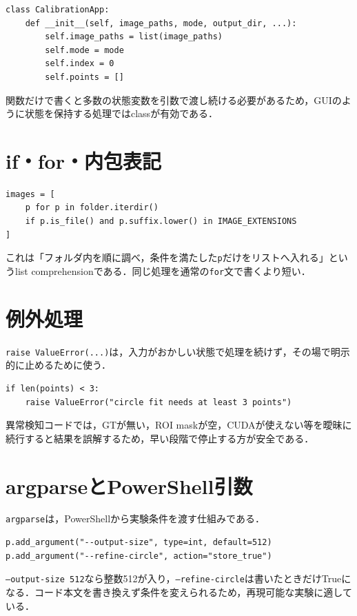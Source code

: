 \documentclass[a4paper,11pt]{ltjsreport}
\begin{document}
\begin{lstlisting}
class CalibrationApp:
    def __init__(self, image_paths, mode, output_dir, ...):
        self.image_paths = list(image_paths)
        self.mode = mode
        self.index = 0
        self.points = []
\end{lstlisting}

関数だけで書くと多数の状態変数を引数で渡し続ける必要があるため，GUIのように状態を保持する処理ではclassが有効である．

\section{if・for・内包表記}
\begin{lstlisting}
images = [
    p for p in folder.iterdir()
    if p.is_file() and p.suffix.lower() in IMAGE_EXTENSIONS
]
\end{lstlisting}
これは「フォルダ内を順に調べ，条件を満たした\texttt{p}だけをリストへ入れる」というlist comprehensionである．同じ処理を通常の\texttt{for}文で書くより短い．

\section{例外処理}
\texttt{raise ValueError(...)}は，入力がおかしい状態で処理を続けず，その場で明示的に止めるために使う．

\begin{lstlisting}
if len(points) < 3:
    raise ValueError("circle fit needs at least 3 points")
\end{lstlisting}

異常検知コードでは，GTが無い，ROI maskが空，CUDAが使えない等を曖昧に続行すると結果を誤解するため，早い段階で停止する方が安全である．

\section{argparseとPowerShell引数}
\texttt{argparse}は，PowerShellから実験条件を渡す仕組みである．

\begin{lstlisting}
p.add_argument("--output-size", type=int, default=512)
p.add_argument("--refine-circle", action="store_true")
\end{lstlisting}

\texttt{--output-size 512}なら整数512が入り，\texttt{--refine-circle}は書いたときだけTrueになる．コード本文を書き換えず条件を変えられるため，再現可能な実験に適している．
\end{document}
